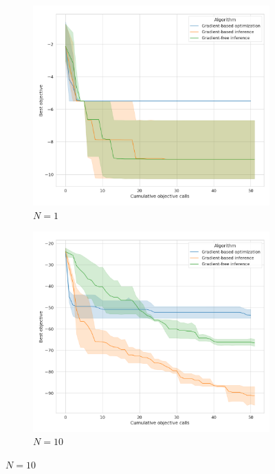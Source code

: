 {\begin{figure}[tb]
    \centering
    \begin{subfigure}[t]{0.24\linewidth}
        \centering
        \includegraphics[width=\linewidth]{images/global_methods/ballistic_1.png}
        \caption{$N=1$}
    \end{subfigure}
    \begin{subfigure}[t]{0.24\linewidth}
        \centering
        \includegraphics[width=\linewidth]{images/global_methods/ballistic_10.png}
        \caption{$N=10$}

\end{subfigure}
\end{figure}}
